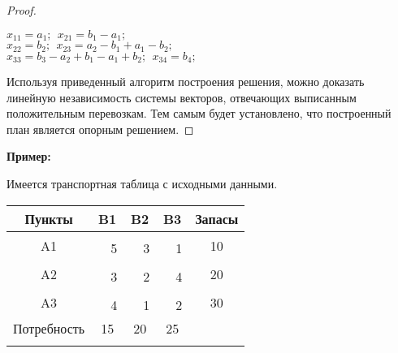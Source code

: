 \documentclass[a4paper,12pt]{article}
\begin{document}
\begin{proof}
		\begin{center}
			$x_{11} = a_1; \ \ x_{21} = b_1 - a_1;$ \\
			$x_{22} = b_2; \ \ x_{23} = a_2 - b_1 + a_1 - b_2;$ \\
			$x_{33} = b_3 - a_2 + b_1 - a_1 + b_2; \ \ x_{34} = b_4;$ \\
		\end{center}
		
		Используя приведенный алгоритм построения решения, можно доказать линейную независимость системы векторов, отвечающих выписанным положительным перевозкам. Тем самым будет установлено, что построенный план является опорным решением.
	\end{proof}
	
	\textbf{Пример:}
	
	Имеется транспортная таблица с исходными данными.
	\begin{center}
		\begin{tabular}{cccccccc}
			\hline
			\multicolumn{1}{|c|}{Пункты} & \multicolumn{2}{c|}{B1} & \multicolumn{2}{c|}{B2} & \multicolumn{2}{c|}{B3} & \multicolumn{1}{c|}{Запасы} \\ \hline
			\multicolumn{1}{|c|}{\multirow{2}{*}{A1}} & \multicolumn{2}{c|}{} & \multicolumn{2}{c|}{} & \multicolumn{2}{c|}{} & \multicolumn{1}{c|}{\multirow{2}{*}{10}} \\ \cline{2-7}
			\multicolumn{1}{|c|}{} & \multicolumn{1}{c|}{} & \multicolumn{1}{c|}{5} & \multicolumn{1}{c|}{} & \multicolumn{1}{c|}{3} & \multicolumn{1}{c|}{} & \multicolumn{1}{c|}{1} & \multicolumn{1}{c|}{} \\ \hline
			\multicolumn{1}{|c|}{\multirow{2}{*}{A2}} & \multicolumn{2}{c|}{} & \multicolumn{2}{c|}{} & \multicolumn{2}{c|}{} & \multicolumn{1}{c|}{\multirow{2}{*}{20}} \\ \cline{2-7}
			\multicolumn{1}{|c|}{} & \multicolumn{1}{c|}{} & \multicolumn{1}{c|}{3} & \multicolumn{1}{c|}{} & \multicolumn{1}{c|}{2} & \multicolumn{1}{c|}{} & \multicolumn{1}{c|}{4} & \multicolumn{1}{c|}{} \\ \hline
			\multicolumn{1}{|c|}{\multirow{2}{*}{A3}} & \multicolumn{2}{c|}{} & \multicolumn{2}{c|}{} & \multicolumn{2}{c|}{} & \multicolumn{1}{c|}{\multirow{2}{*}{30}} \\ \cline{2-7}
			\multicolumn{1}{|c|}{} & \multicolumn{1}{c|}{} & \multicolumn{1}{c|}{4} & \multicolumn{1}{c|}{} & \multicolumn{1}{c|}{1} & \multicolumn{1}{c|}{} & \multicolumn{1}{c|}{2} & \multicolumn{1}{c|}{} \\ \hline
			\multicolumn{1}{|c|}{Потребность} & \multicolumn{2}{c|}{15} & \multicolumn{2}{c|}{20} & \multicolumn{2}{c|}{25} &  \\ \cline{1-7}
			\multicolumn{1}{l}{} & \multicolumn{1}{l}{} & \multicolumn{1}{l}{} & \multicolumn{1}{l}{} & \multicolumn{1}{l}{} & \multicolumn{1}{l}{} & \multicolumn{1}{l}{} & \multicolumn{1}{l}{}
		\end{tabular}
	\end{center}
	
\end{document}
